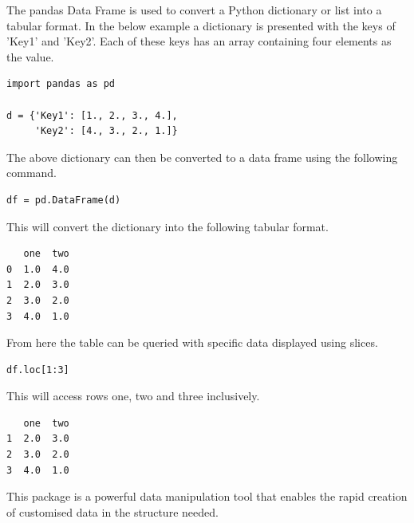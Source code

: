 The pandas Data Frame is used to convert a Python dictionary or list into a tabular format. In the below example a dictionary is presented with the keys of 'Key1' and 'Key2'. Each of these keys has an array containing four elements as the value.~\cite{IntrotoD8:online}
\begin{verbatim}
import pandas as pd

d = {'Key1': [1., 2., 3., 4.],
     'Key2': [4., 3., 2., 1.]}
\end{verbatim}
The above dictionary can then be converted to a data frame using the following command.
\begin{verbatim}
df = pd.DataFrame(d)
\end{verbatim}
This will convert the dictionary into the following tabular format.
\begin{verbatim}
   one  two
0  1.0  4.0
1  2.0  3.0
2  3.0  2.0
3  4.0  1.0
\end{verbatim} 
From here the table can be queried with specific data displayed using slices.
\begin{verbatim}
df.loc[1:3]
\end{verbatim}
This will access rows one, two and three inclusively.
\begin{verbatim}
   one  two
1  2.0  3.0
2  3.0  2.0
3  4.0  1.0
\end{verbatim} 
This package is a powerful data manipulation tool that enables the rapid creation of customised data in the structure needed.
